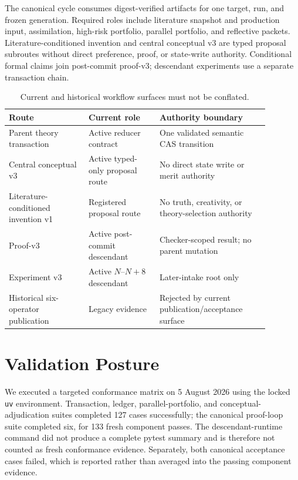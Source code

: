\documentclass[11pt]{article}
\begin{document}
The canonical cycle consumes digest-verified artifacts for one target, run, and frozen generation. Required roles include literature snapshot and production input, assimilation, high-risk portfolio, parallel portfolio, and reflective packets. Literature-conditioned invention and central conceptual v3 are typed proposal subroutes without direct preference, proof, or state-write authority. Conditional formal claims join post-commit proof-v3; descendant experiments use a separate transaction chain.

\begin{table}[ht]
\centering\small
\begin{tabular}{p{0.27\linewidth}p{0.24\linewidth}p{0.37\linewidth}}
\toprule
Route & Current role & Authority boundary \\
\midrule
Parent theory transaction & Active reducer contract & One validated semantic CAS transition \\
Central conceptual v3 & Active typed-only proposal route & No direct state write or merit authority \\
Literature-conditioned invention v1 & Registered proposal route & No truth, creativity, or theory-selection authority \\
Proof-v3 & Active post-commit descendant & Checker-scoped result; no parent mutation \\
Experiment v3 & Active $N$--$N+8$ descendant & Later-intake root only \\
Historical six-operator publication & Legacy evidence & Rejected by current publication/acceptance surface \\
\bottomrule
\end{tabular}
\caption{Current and historical workflow surfaces must not be conflated.}
\end{table}

\section{Validation Posture}

We executed a targeted conformance matrix on 5 August 2026 using the locked \texttt{uv} environment. Transaction, ledger, parallel-portfolio, and conceptual-adjudication suites completed 127 cases successfully; the canonical proof-loop suite completed six, for 133 fresh component passes. The descendant-runtime command did not produce a complete pytest summary and is therefore not counted as fresh conformance evidence. Separately, both canonical acceptance cases failed, which is reported rather than averaged into the passing component evidence.
\end{document}
